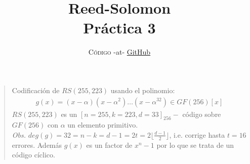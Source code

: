 \documentclass[12pt]{article}
\title{Reed-Solomon\\\small{Práctica 3}}
\author
{\small{\textsc{Código}} -at- \href{https://github.com/Dr-Tredok/CodeTheory-2016-2/tree/master/P03}{GitHub}}
\date{}
\newenvironment{sciabstract}{%
\begin{quote} }
{\end{quote}}
\begin{document}
 


\baselineskip24pt


\maketitle 




\begin{sciabstract}
  Codificación de $RS(255, 223)$ usando el polinomio:
  \begin{align*}
  g(x) = (x - \alpha )(x -\alpha^2)\ldots (x - \alpha^{32}) \in GF(256)[x]
  \end{align*}
  $RS(255, 223)$ es un $[n = 255, k = 223, d = 33]_{256} -$ código sobre $GF(256)$ con $\alpha$ un elemento primitivo.
  \\\textit{Obs.} $deg(g) = 32 = n - k = d - 1 = 2 t = 2 \lfloor \frac{d - 1}{2} \rfloor$, i.e. corrige hasta $ t = 16$ errores. Además $g(x)$ es un factor de $x^n - 1$ por lo que se trata de un código cíclico. 
\end{sciabstract}



\end{document}
